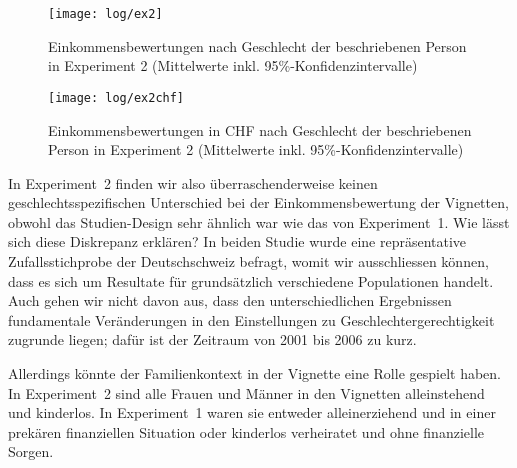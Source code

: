 \documentclass[a4paper,12pt]{article}
\renewcommand{\baselinestretch}{1.1}
\newif\ifcomments
\newcommand{\comment}[1]{%
    \ifcomments\marginpar{\renewcommand{\baselinestretch}{1}\tiny\hspace*{-1.1em}\colorbox{gray!20}%
    {\textcolor{red}{\parbox[t]{.9in}{\raggedright #1}}}}\fi}
\begin{document}
\begin{figure}\centering
    \texttt{[image: log/ex2]}
    \caption{Einkommensbewertungen nach Geschlecht der beschriebenen Person in 
    Experiment 2 (Mittelwerte inkl. 95\%-Konfidenzintervalle)}\label{fig-ex2}
\end{figure}
\begin{figure}\centering
    \texttt{[image: log/ex2chf]}
    \caption{Einkommensbewertungen in CHF nach Geschlecht der beschriebenen Person in 
    Experiment 2 (Mittelwerte inkl. 95\%-Konfidenzintervalle)}\label{fig-ex2chf}
\end{figure}


In Experiment~2 finden wir also überraschenderweise keinen geschlechtsspezifischen
Unterschied bei der Einkommensbewertung der Vignetten, obwohl das
Studien-Design sehr ähnlich war wie das von Experiment~1. Wie lässt sich diese
Diskrepanz erklären? In beiden Studie wurde eine repräsentative
Zufallsstichprobe der Deutschschweiz befragt, womit wir ausschliessen können,
dass es sich um Resultate für grundsätzlich verschiedene Populationen handelt.
Auch gehen wir nicht davon aus, dass den unterschiedlichen Ergebnissen
fundamentale Veränderungen in den Einstellungen zu Geschlechtergerechtigkeit
zugrunde liegen; dafür ist der Zeitraum von 2001 bis 2006 zu kurz.

Allerdings könnte der Familienkontext in der Vignette eine Rolle gespielt
haben. In Experiment~2 sind alle Frauen und Männer in den Vignetten
alleinstehend und kinderlos. In Experiment~1 waren sie entweder alleinerziehend
und in einer prekären finanziellen Situation oder kinderlos verheiratet und
ohne finanzielle Sorgen.
\comment{Das Resultat könnte aber auch
    ein Artefakt sein aufgrund der Fragebogenkonstruktion: Bei Exp. 1 sollen die
    Leute in der Frage vor der Vignette angeben, was lohnrelevant sein soll. Zur
    Auswahl stehen Verdienst- und Bedürftigkeitskriterien. Bei Exp. 2 geht es in
    den beiden Fragen vor der Vignette zuerst um die Rechtfertigung von
    Managerlöhnen, im Vgl. zu denen Journi, Schreiner und Krankenschwester
    natürlich alle wenig verdienen und dann wird nach dem angenommenen
    Durchschnittseinkommen gefragt, was die Leute im Mittel auf 8'500.- schätzen,
    also auch viel höher als alle Vignetten. Dass sich deshalb die
    Geschlechterunterschiede aufheben ist jedoch längst nicht zwingend (v.a. weil
    die Bewertung insgesamt nur als leicht und nicht viel zu tief ausfällt).}
\end{document}
